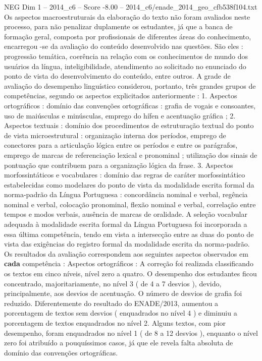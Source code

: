 \begin{textsample}{NEG Dim 1 – 2014\_c6 – Score -8.00 – 2014\_c6/enade\_2014\_geo\_cfb538f104.txt}
Os aspectos macroestruturais da elaboração do texto não foram avaliados neste processo, para não penalizar duplamente os estudantes, já que a banca de formação geral, composta por profissionais de diferentes áreas do conhecimento, encarregou -se da avaliação do conteúdo desenvolvido nas questões.
São eles : progressão temática, coerência na relação com os conhecimentos de mundo dos usuários da língua, inteligibilidade, atendimento ao solicitado no enunciado do ponto de vista do desenvolvimento do conteúdo, entre outros.
A grade de avaliação do desempenho linguístico considerou, portanto, três grandes grupos de competências, segundo os aspectos explicitados anteriormente : 1.
Aspectos ortográficos : domínio das convenções ortográficas : grafia de vogais e consoantes, uso de maiúsculas e minúsculas, emprego do hífen e acentuação gráfica ; 2.
Aspectos textuais : domínio dos procedimentos de estruturação textual do ponto de vista microestrutural : organização interna dos períodos, emprego de conectores para a articulação lógica entre os períodos e entre os parágrafos, emprego de marcas de referenciação lexical e pronominal ; utilização dos sinais de pontuação que contribuem para a organização lógica da frase. 3.
Aspectos morfossintáticos e vocabulares : domínio das regras de caráter morfossintático estabelecidas como modelares do ponto de vista da modalidade escrita formal da norma-padrão da Língua Portuguesa : concordância nominal e verbal, regência nominal e verbal, colocação pronominal, flexão nominal e verbal, correlação entre tempos e modos verbais, ausência de marcas de oralidade.
A seleção vocabular adequada à modalidade escrita formal da Língua Portuguesa foi incorporada a essa última competência, tendo em vista a intersecção entre as duas do ponto de vista das exigências do registro formal da modalidade escrita da norma-padrão.
Os resultados da avaliação correspondem aos seguintes aspectos observados em \textbf{cada} competência : Aspectos ortográficos : A correção foi realizada classificando os textos em cinco níveis, nível zero a quatro.
O desempenho dos estudantes ficou concentrado, majoritariamente, no nível 3 ( de 4 a 7 desvios ), devido, principalmente, aos desvios de acentuação.
O número de desvios de grafia foi reduzido.
Diferentemente do resultado do ENADE/2013, aumentou a porcentagem de textos sem desvios ( enquadrados no nível 4 ) e diminuiu a porcentagem de textos enquadrados no nível 2.
Alguns textos, com pior desempenho, foram enquadrados no nível 1 ( de 8 a 12 desvios ), enquanto o nível zero foi atribuído a pouquíssimos casos, já que ele revela falta absoluta de domínio das convenções ortográficas.

\end{textsample}
